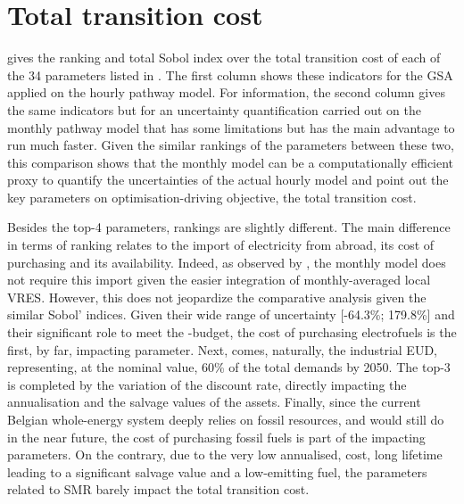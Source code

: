 \section{Total transition cost}
\label{app:UQ_transition_cost}

 gives the ranking and total Sobol index over the total transition cost of each of the 34 parameters listed in . The first column shows these indicators for the \gls{GSA} applied on the hourly pathway model. For information, the second column gives the same indicators but for an uncertainty quantification carried out on the monthly pathway model that has some limitations \cite{limpens2024pathway} but has the main advantage to run much faster. Given the similar rankings of the parameters between these two, this comparison shows that the monthly model can be a computationally efficient proxy to quantify the uncertainties of the actual hourly model and point out the key parameters on optimisation-driving objective, the total transition cost. 

Besides the top-4 parameters, rankings are slightly different. The main difference in terms of ranking relates to the import of electricity from abroad, \ie its cost of purchasing and its availability. Indeed, as observed by \citet{limpens2024pathway}, the monthly model does not require this import given the easier integration of monthly-averaged local \gls{VRES}. However, this does not jeopardize the comparative analysis given the similar Sobol' indices. Given their wide range of uncertainty [-64.3\%; 179.8\%] and their significant role to meet the -budget, the cost of purchasing electrofuels is the first, by far, impacting parameter. Next, comes, naturally, the industrial \gls{EUD}, representing, at the nominal value, 60\% of the total demands by 2050. The top-3 is completed by the variation of the discount rate, directly impacting the annualisation and the salvage values of the assets. Finally, since the current Belgian whole-energy system deeply relies on fossil resources, and would still do in the near future, the cost of purchasing fossil fuels is part of the impacting parameters. On the contrary, due to the very low annualised, cost, long lifetime leading to a significant salvage value and a low-emitting fuel, the parameters related to \gls{SMR} barely impact the total transition cost.


